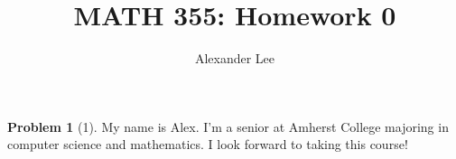 \documentclass{amsart}
\title{MATH 355: Homework 0}
\author{Alexander Lee}
\theoremstyle{definition}
\newtheorem*{problem}{Problem}
\begin{document}
\maketitle

\begin{problem}[1]
  My name is Alex. I'm a senior at Amherst College majoring in computer science
  and mathematics. I look forward to taking this course!
\end{problem}
\end{document}
